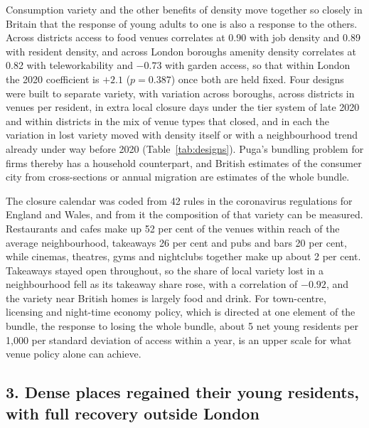 \documentclass[11pt,a4paper]{article}
\begin{document}
Consumption variety and the other benefits of density move together so closely in Britain that the response of young adults to one is also a response to the others. Across districts access to food venues correlates at 0.90 with job density and 0.89 with resident density, and across London boroughs amenity density correlates at 0.82 with teleworkability and $-0.73$ with garden access, so that within London the 2020 coefficient is $+2.1$ ($p = 0.387$) once both are held fixed. Four designs were built to separate variety, with variation across boroughs, across districts in venues per resident, in extra local closure days under the tier system of late 2020 and within districts in the mix of venue types that closed, and in each the variation in lost variety moved with density itself or with a neighbourhood trend already under way before 2020 (Table~\ref{tab:designs}). Puga's bundling problem for firms thereby has a household counterpart, and British estimates of the consumer city from cross-sections or annual migration are estimates of the whole bundle.

The closure calendar was coded from 42 rules in the coronavirus regulations for England and Wales, and from it the composition of that variety can be measured. Restaurants and cafes make up 52 per cent of the venues within reach of the average neighbourhood, takeaways 26 per cent and pubs and bars 20 per cent, while cinemas, theatres, gyms and nightclubs together make up about 2 per cent. Takeaways stayed open throughout, so the share of local variety lost in a neighbourhood fell as its takeaway share rose, with a correlation of $-0.92$, and the variety near British homes is largely food and drink. For town-centre, licensing and night-time economy policy, which is directed at one element of the bundle, the response to losing the whole bundle, about 5 net young residents per 1,000 per standard deviation of access within a year, is an upper scale for what venue policy alone can achieve.

\subsection*{3. Dense places regained their young residents, with full recovery outside London}
\end{document}

